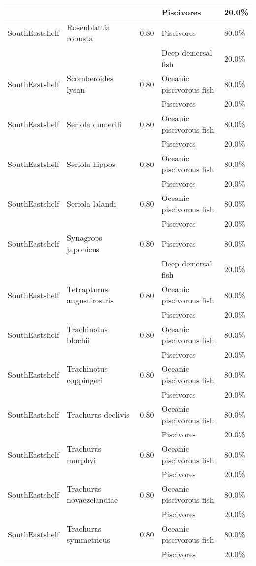 \begin{longtable}{llcll}
& & & Piscivores & 20.0\% \\
\hline
SouthEastshelf & Rosenblattia robusta & 0.80 & Piscivores & 80.0\% \\
& & & Deep demersal fish & 20.0\% \\
\hline
SouthEastshelf & Scomberoides lysan & 0.80 & Oceanic piscivorous fish & 80.0\% \\
& & & Piscivores & 20.0\% \\
\hline
SouthEastshelf & Seriola dumerili & 0.80 & Oceanic piscivorous fish & 80.0\% \\
& & & Piscivores & 20.0\% \\
\hline
SouthEastshelf & Seriola hippos & 0.80 & Oceanic piscivorous fish & 80.0\% \\
& & & Piscivores & 20.0\% \\
\hline
SouthEastshelf & Seriola lalandi & 0.80 & Oceanic piscivorous fish & 80.0\% \\
& & & Piscivores & 20.0\% \\
\hline
SouthEastshelf & Synagrops japonicus & 0.80 & Piscivores & 80.0\% \\
& & & Deep demersal fish & 20.0\% \\
\hline
SouthEastshelf & Tetrapturus angustirostris & 0.80 & Oceanic piscivorous fish & 80.0\% \\
& & & Piscivores & 20.0\% \\
\hline
SouthEastshelf & Trachinotus blochii & 0.80 & Oceanic piscivorous fish & 80.0\% \\
& & & Piscivores & 20.0\% \\
\hline
SouthEastshelf & Trachinotus coppingeri & 0.80 & Oceanic piscivorous fish & 80.0\% \\
& & & Piscivores & 20.0\% \\
\hline
SouthEastshelf & Trachurus declivis & 0.80 & Oceanic piscivorous fish & 80.0\% \\
& & & Piscivores & 20.0\% \\
\hline
SouthEastshelf & Trachurus murphyi & 0.80 & Oceanic piscivorous fish & 80.0\% \\
& & & Piscivores & 20.0\% \\
\hline
SouthEastshelf & Trachurus novaezelandiae & 0.80 & Oceanic piscivorous fish & 80.0\% \\
& & & Piscivores & 20.0\% \\
\hline
SouthEastshelf & Trachurus symmetricus & 0.80 & Oceanic piscivorous fish & 80.0\% \\
& & & Piscivores & 20.0\% \\

\end{longtable}
